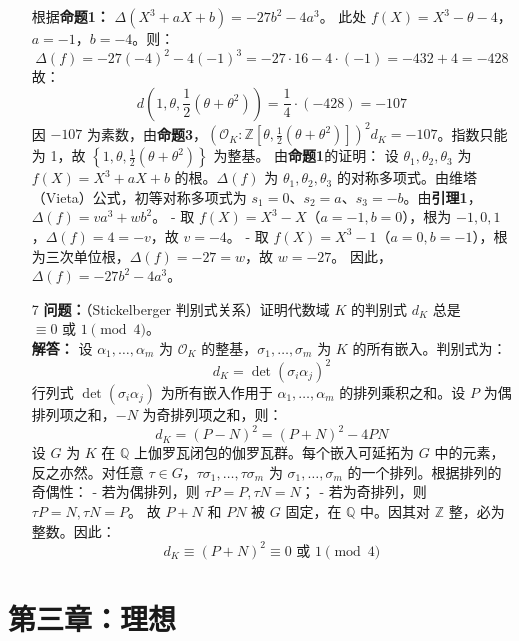\documentclass[UTF8]{ctexart}
\begin{document}
\begin{enumerate}
根据\textbf{命题1：} \(\Delta(X^3 + aX + b) = -27b^2 - 4a^3\)。  
此处 \(f(X) = X^3 - \theta - 4\)，\(a = -1\)，\(b = -4\)。则：
\[
\Delta(f) = -27(-4)^2 - 4(-1)^3 = -27 \cdot 16 - 4 \cdot (-1) = -432 + 4 = -428
\]
故：
\[
d\left(1, \theta, \frac{1}{2}(\theta + \theta^2)\right) = \frac{1}{4} \cdot (-428) = -107
\]
因 \(-107\) 为素数，由\textbf{命题3}，\(\left(\mathcal{O}_K : \mathbb{Z}[\theta, \frac{1}{2}(\theta + \theta^2)]\right)^2 d_K = -107\)。指数只能为 1，故 \(\left\{1, \theta, \frac{1}{2}(\theta + \theta^2)\right\}\) 为整基。  
由\textbf{命题1}的证明： 设 \(\theta_1, \theta_2, \theta_3\) 为 \(f(X) = X^3 + aX + b\) 的根。\(\Delta(f)\) 为 \(\theta_1, \theta_2, \theta_3\) 的对称多项式。由维塔（Vieta）公式，初等对称多项式为 \(s_1 = 0\)、\(s_2 = a\)、\(s_3 = -b\)。由\textbf{引理1}，\(\Delta(f) = v a^3 + w b^2\)。  
- 取 \(f(X) = X^3 - X\)（\(a = -1, b = 0\)），根为 \(-1, 0, 1\)，\(\Delta(f) = 4 = -v\)，故 \(v = -4\)。  
- 取 \(f(X) = X^3 - 1\)（\(a = 0, b = -1\)），根为三次单位根，\(\Delta(f) = -27 = w\)，故 \(w = -27\)。  
因此，\(\Delta(f) = -27 b^2 - 4 a^3\)。  



\item[7] 
\textbf{问题：}（Stickelberger 判别式关系）证明代数域 \(K\) 的判别式 \(d_K\) 总是 \(\equiv 0 \text{ 或 } 1 \pmod{4}\)。\\
\textbf{解答：} 设 \(\alpha_1, \dots, \alpha_m\) 为 \(\mathcal{O}_K\) 的整基，\(\sigma_1, \dots, \sigma_m\) 为 \(K\) 的所有嵌入。判别式为：
\[
d_K = \det(\sigma_i \alpha_j)^2
\]
行列式 \(\det(\sigma_i \alpha_j)\) 为所有嵌入作用于 \(\alpha_1, \dots, \alpha_m\) 的排列乘积之和。设 \(P\) 为偶排列项之和，\(-N\) 为奇排列项之和，则：
\[
d_K = (P - N)^2 = (P + N)^2 - 4 P N
\]
设 \(G\) 为 \(K\) 在 \(\mathbb{Q}\) 上伽罗瓦闭包的伽罗瓦群。每个嵌入可延拓为 \(G\) 中的元素，反之亦然。对任意 \(\tau \in G\)，\(\tau \sigma_1, \dots, \tau \sigma_m\) 为 \(\sigma_1, \dots, \sigma_m\) 的一个排列。根据排列的奇偶性：
- 若为偶排列，则 \(\tau P = P, \tau N = N\)；
- 若为奇排列，则 \(\tau P = N, \tau N = P\)。  
故 \(P + N\) 和 \(P N\) 被 \(G\) 固定，在 \(\mathbb{Q}\) 中。因其对 \(\mathbb{Z}\) 整，必为整数。因此：
\[
d_K \equiv (P + N)^2 \equiv 0 \text{ 或 } 1 \pmod{4}
\]

\end{enumerate}


\section{第三章：理想}
\end{document}
